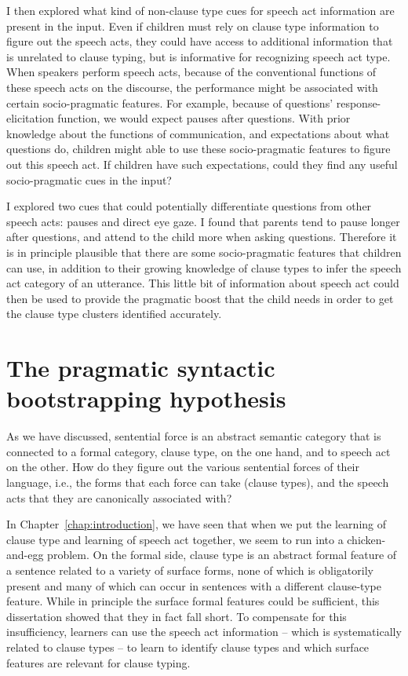 I then explored what kind of non-clause type cues for speech act information are present in the input. Even if children must rely on clause type information to figure out the speech acts, they could have access to additional information that is unrelated to clause typing, but is informative for recognizing speech act type. When speakers perform speech acts, because of the conventional functions of these speech acts on the discourse, the performance might be associated with certain socio-pragmatic features. For example, because of questions' response-elicitation function, we would expect pauses after questions. With prior knowledge about the functions of communication, and expectations about what questions do, children might able to use these socio-pragmatic features to figure out this speech act. If children have such expectations, could they find any useful socio-pragmatic cues in the input? 

I explored two cues that could potentially differentiate questions from other speech acts: pauses and direct eye gaze. I found that parents tend to pause longer after questions, and attend to the child more when asking questions. Therefore it is in principle plausible that there are some socio-pragmatic features that children can use, in addition to their growing knowledge of clause types to infer the speech act category of an utterance. This little bit of information about speech act could then be used to provide the pragmatic boost that the child needs in order to get the clause type clusters identified accurately.


\section{The pragmatic syntactic bootstrapping hypothesis}

As we have discussed, sentential force is an abstract semantic category that is connected to a formal category, clause type, on the one hand, and to speech act on the other. How do they figure out the various sentential forces of their language, i.e., the forms that each force can take (clause types), and the speech acts that they are canonically associated with? 

In Chapter~\ref{chap:introduction}, we have seen that when we put the learning of clause type and learning of speech act together, we seem to run into a chicken-and-egg problem. On the formal side, clause type is an abstract formal feature of a sentence related to a variety of surface forms, none of which is obligatorily present and many of which can occur in sentences with a different clause-type feature. While in principle the surface formal features could be sufficient, this dissertation showed that they in fact fall short. To compensate for this insufficiency, learners can use the speech act information -- which is systematically related to clause types -- to learn to identify clause types and which surface features are relevant for clause typing. 

